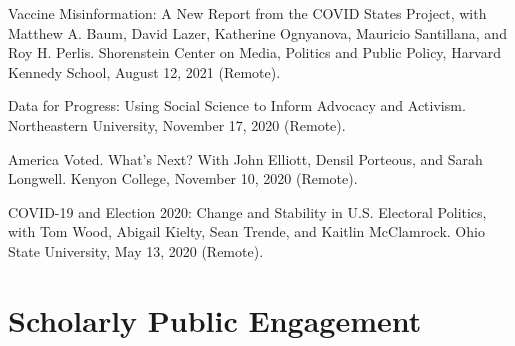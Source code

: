 \documentclass[letterpaper]{article}
\renewenvironment{itemize}{
  \begin{list}{}{
    \setlength{\leftmargin}{1.5em}
  }
}{
  \end{list}
}
\begin{document}
\begin{itemize}
\item Vaccine Misinformation: A New Report from the COVID States Project, with Matthew A. Baum, David Lazer, Katherine Ognyanova, Mauricio Santillana, and Roy H. Perlis. Shorenstein Center on Media, Politics and Public Policy, Harvard Kennedy School, August 12, 2021 (Remote).

\item Data for Progress: Using Social Science to Inform Advocacy and Activism. Northeastern University, November 17, 2020 (Remote). 

\item America Voted. What's Next? With John Elliott, Densil Porteous, and Sarah Longwell. Kenyon College, November 10, 2020 (Remote). 

\item COVID-19 and Election 2020: Change and Stability in U.S. Electoral Politics, with Tom Wood, Abigail Kielty, Sean Trende, and Kaitlin McClamrock. Ohio State University, May 13, 2020 (Remote).
 
\end{itemize}

\section*{Scholarly Public Engagement}
\end{document}
